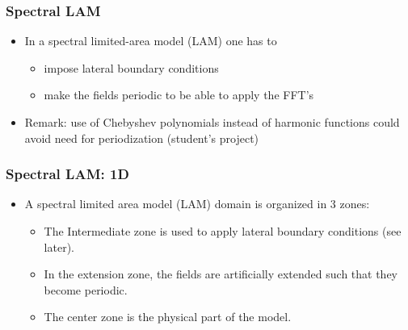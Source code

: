 \documentclass[aspectratio=43,9pt]{beamer}
\begin{document}
%
%
\begin{frame}
	\frametitle{Spectral LAM}
	\vfill\begin{itemize}
		\item In a spectral limited-area model (LAM) one has to\vfill
			\begin{itemize}
				\item impose lateral boundary conditions\vfill
				\item make the fields periodic to be able to apply the FFT's
			\end{itemize}\vfill
		\item Remark: use of Chebyshev polynomials instead of harmonic functions could avoid need for periodization (student's project)
	\end{itemize}\vfill
\end{frame}
%
%
\begin{frame}
	\frametitle{Spectral LAM: 1D}
	\vfill\begin{itemize}
		\item A spectral limited area model (LAM) domain is organized in 3 zones:
			\begin{center}
			\end{center}
			\vfill
			\begin{itemize}
				\item The Intermediate zone is used to apply lateral boundary conditions (see later).
				\item In the extension zone, the fields are artificially extended such that they become periodic.
				\item The center zone is the physical part of the model.
			\end{itemize}
	\end{itemize}\vfill
\end{frame}
\end{document}
